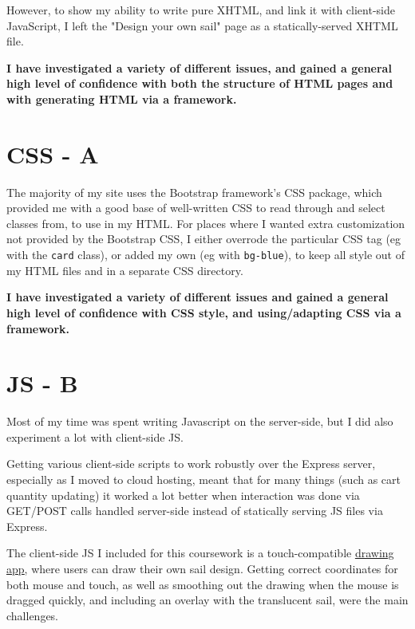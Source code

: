 \documentclass[12pt]{article}
\begin{document}
However, to show my ability to write pure XHTML, and link it with client-side JavaScript, I left the "Design your own sail" page as a statically-served XHTML file.

\textbf{I have investigated a variety of different issues, and gained a general high level of confidence with both the structure of HTML pages and with generating HTML via a framework.}

\clearpage
\section*{CSS \large\normalfont - A} 
The majority of my site uses the Bootstrap framework's CSS package, which provided me with a good base of well-written CSS to read through and select classes from, to use in my HTML.
For places where I wanted extra customization not provided by the Bootstrap CSS, I either overrode the particular CSS tag (eg with the \verb|card| class), or added my own (eg with \verb|bg-blue|), to keep all style out of my HTML files and in a separate CSS directory.

\textbf{I have investigated a variety of different issues and gained a general high level of confidence with CSS style, and using/adapting CSS via a framework.}


\section*{JS \large\normalfont - B}
Most of my time was spent writing Javascript on the server-side, but I did also experiment a lot with client-side JS. 

Getting various client-side scripts to work robustly over the Express server, especially as I moved to cloud hosting, meant that for many things (such as cart quantity updating) it worked a lot better when interaction was done via GET/POST calls handled server-side instead of statically serving JS files via Express.

The client-side JS I included for this coursework is a touch-compatible \underline{\href{https://windsurf-shop.herokuapp.com/design}{drawing app}}, where users can draw their own sail design.
Getting correct coordinates for both mouse and touch, as well as smoothing out the drawing when the mouse is dragged quickly, and including an overlay with the translucent sail, were the main challenges.
\end{document}
